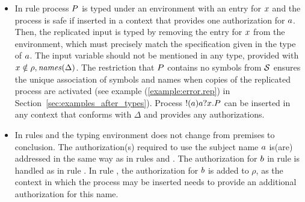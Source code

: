 \begin{itemize}
\item In rule  process $P$ is typed under an environment with an entry for $x$ and
the process is safe if inserted in a context that provides one authorization for $a$. Then, the replicated input is typed by removing the entry for $x$ from the environment, which must precisely match the specification given in the type of $a$. The input variable should not be mentioned in any type,  provided with $x\notin\rho,\mathit{names}(\Delta)$. The restriction that $P$ contains no symbols from $\cal{S}$ ensures the unique association of symbols and names when copies of the replicated process are activated
 (see example (\ref{example:error.rep}) in Section~\ref{sec:examples_after_types}).  Process $!(a)a?x.P$ can be inserted in any context that conforms with $\Delta$ and provides any authorizations. 

\item In rules   and  
 the typing environment does not change from premises to conclusion.
The authorization(s) required to use the subject name $a$ is(are) addressed in the same way as in rules  and . The authorization for $b$ in rule  is handled as in rule . In rule , the authorization for $b$ is added to $\rho$, as the context in which the process may be inserted needs to provide an additional authorization for this name. %
\end{itemize}
%
